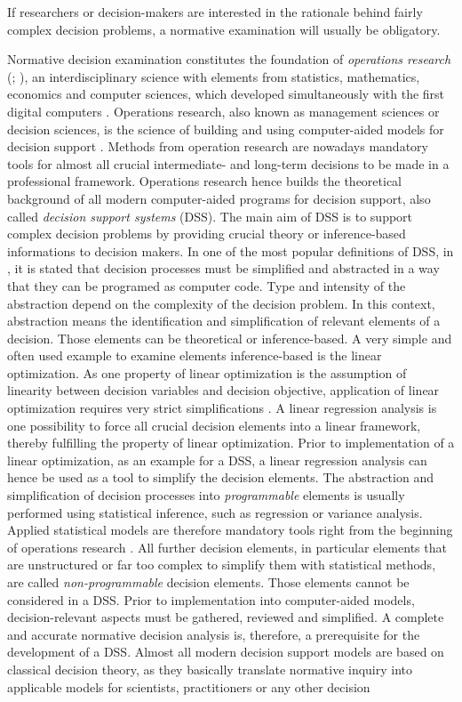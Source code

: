 If researchers or decision-makers are interested in the rationale behind fairly complex decision problems, a normative examination will usually be obligatory.

Normative decision examination constitutes the foundation of \textit{operations research} (\citealp[p. 112]{shim_2002}; \citealp[p. 498]{simon_1979}), an interdisciplinary science with elements from statistics, mathematics, economics and computer sciences, which developed simultaneously with the first digital computers \citep{churchman_1957}. Operations research, also known as management sciences or decision sciences, is the science of building and using computer-aided models for decision support \citep[p. 373-374]{wacker_1998}. Methods from operation research are nowadays mandatory tools for almost all crucial intermediate- and long-term decisions to be made in a professional framework. Operations research hence builds the theoretical background of all modern computer-aided programs for decision support, also called \textit{decision support systems} (DSS). The main aim of DSS is to support complex decision problems by providing crucial theory or inference-based informations to decision makers. In one of the most popular definitions of DSS, in \citet[p. 26]{gorry_1971}, it is stated that decision processes must be simplified and abstracted in a way that they can be programed as computer code. Type and intensity of the abstraction depend on the complexity of the decision problem. In this context, abstraction means the identification and simplification of relevant elements of a decision. Those elements can be theoretical or inference-based. A very simple and often used example to examine elements inference-based is the linear optimization. As one property of linear optimization is the assumption of linearity between decision variables and decision objective, application of linear optimization requires very strict simplifications \citep[p. 129]{kangas_2015}. A linear regression analysis is one possibility to force all crucial decision elements into a linear framework, thereby fulfilling the property of linear optimization. Prior to implementation of a linear optimization, as an example for a DSS, a linear regression analysis can hence be used as a tool to simplify the decision elements. The abstraction and simplification of decision processes into \textit{programmable} elements is usually performed using statistical inference, such as regression or variance analysis. Applied statistical models are therefore mandatory tools right from the beginning of operations research \citep{churchman_1957}. All further decision elements, in particular elements that are unstructured or far too complex to simplify them with statistical methods, are called \textit{non-programmable} decision elements. Those elements cannot be considered in a DSS. Prior to implementation into computer-aided models, decision-relevant aspects must be gathered, reviewed and simplified. A complete and accurate normative decision analysis is, therefore, a prerequisite for the development of a DSS. Almost all modern decision support models are based on classical decision theory, as they basically translate normative inquiry into applicable models for scientists, practitioners or any other decision 
